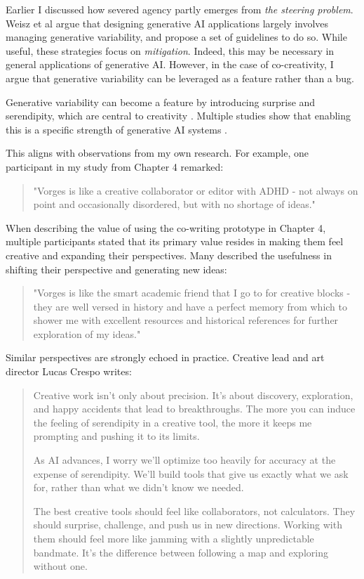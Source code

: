 Earlier I discussed how severed agency partly emerges from \textit{the steering problem}. Weisz et al \cite{Weisz2024-io} argue that designing generative AI applications largely involves managing generative variability, and propose a set of guidelines to do so. While useful, these strategies focus on \textit{mitigation}. Indeed, this may be necessary in general applications of generative AI. However, in the case of co-creativity, I argue that generative variability can be leveraged as a feature rather than a bug.

Generative variability can become a feature by introducing surprise and serendipity, which are central to creativity \cite{Simon1967-nr, Lubart2001-vl, Grace2015-uc, Moruzzi2022-gp}. Multiple studies show that enabling this is a specific strength of generative AI systems \cite{Lawton2023-tb, Park2024-gw, Koch2020-gx}.

This aligns with observations from my own research. For example, one participant in my study from Chapter 4 remarked:

\begin{quote}
"Vorges is like a creative collaborator or editor with ADHD - not always on point and occasionally disordered, but with no shortage of ideas."
\end{quote}

When describing the value of using the co-writing prototype in Chapter 4, multiple participants stated that its primary value resides in making them feel creative and expanding their perspectives. Many described the usefulness in shifting their perspective and generating new ideas:

\begin{quote}
"Vorges is like the smart academic friend that I go to for creative blocks - they are well versed in history and have a perfect memory from which to shower me with excellent resources and historical references for further exploration of my ideas."
\end{quote}

Similar perspectives are strongly echoed in practice. Creative lead and art director Lucas Crespo writes: 

\begin{quote}
Creative work isn't only about precision. It's about discovery, exploration, and happy accidents that lead to breakthroughs. The more you can induce the feeling of serendipity in a creative tool, the more it keeps me prompting and pushing it to its limits.

As AI advances, I worry we'll optimize too heavily for accuracy at the expense of serendipity. We'll build tools that give us exactly what we ask for, rather than what we didn't know we needed.

The best creative tools should feel like collaborators, not calculators. They should surprise, challenge, and push us in new directions. Working with them should feel more like jamming with a slightly unpredictable bandmate. It's the difference between following a map and exploring without one. 
\end{quote} \cite{Crespo2025-wr}


